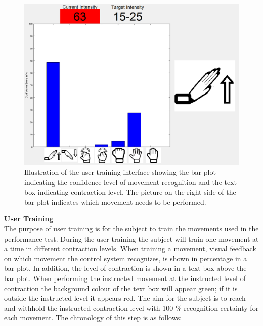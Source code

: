 \begin{figure}[H]                 
	\includegraphics[width=.6\textwidth]{figures/xBackground/usertraintestGUI}  
	\caption{Illustration of the user training interface showing the bar plot indicating the confidence level of movement recognition and the text box indicating contraction level. The picture on the right side of the bar plot indicates which movement needs to be performed.}
	\label{fig:usertraintestGUI} 
\end{figure}

\textbf{User Training} \\ %
The purpose of user training is for the subject to train the movements used in the performance test. During the user training the subject will train one movement at a time in different contraction levels. When training a movement, visual feedback on which movement the control system recognizes, is shown in percentage in a bar plot. In addition, the level of contraction is shown in a text box above the bar plot. When performing the instructed movement at the instructed level of contraction the background colour of the text box will appear green; if it is outside the instructed level it appears red. The aim for the subject is to reach and withhold the instructed contraction level with 100 \% recognition certainty for each movement. The chronology of this step is as follows:


